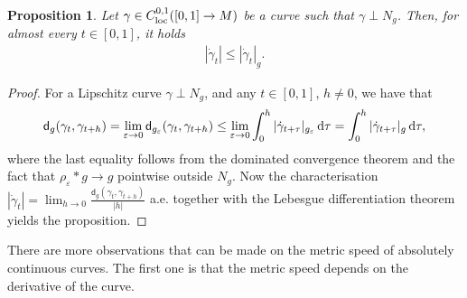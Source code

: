 \documentclass[a4paper,10pt]{article}
\newtheorem{proposition}[theorem]{Proposition}
\numberwithin{equation}{section}
\newcommand{\e}{\varepsilon}
\newcommand{\sfd}{\mathsf d}
\newcommand{\di}{{\rm d}}
\begin{document}
 \begin{proposition}
     Let $\gamma \in C^{0,1}_{\rm loc}([0, 1] \to M)$ be a curve such that $\gamma \perp N_g$. Then, for almost every $t \in [0,1]$, it holds
     \begin{align*}
          |\dot{\gamma}_t| \leq |\dot{\gamma}_t|_g.
     \end{align*}
 \end{proposition}
 \begin{proof}
     For a Lipschitz curve $\gamma \perp N_g$, and any $t \in [0,1]$, $h \neq 0$, we have that
     \begin{align*}
         \sfd_g(\gamma_t, \gamma_{t+h}) = \lim_{\e \to 0} \sfd_{g_\e}(\gamma_t, \gamma_{t+h}) \leq \lim_{\e \to 0}\int_0^h |\dot{\gamma}_{t+\tau}|_{g_\e}\, \di \tau = \int_0^h |\dot{\gamma}_{t+\tau}|_g\, \di \tau,
     \end{align*}
     where the last equality follows from the dominated convergence theorem and the fact that $\rho_\e*g \to g$ pointwise outside $N_g$. Now the characterisation $|\dot{\gamma}_t|= \lim_{h \to 0} \frac{\sfd_g(\gamma_t, \gamma_{t+h})}{|h|}$ a.e. together with the Lebesgue differentiation theorem yields the proposition. 
 \end{proof}
 There are more observations that can be made on the metric speed of absolutely continuous curves. The first one is that the metric speed depends on the derivative of the curve. 
\smallskip
 
\end{document}
